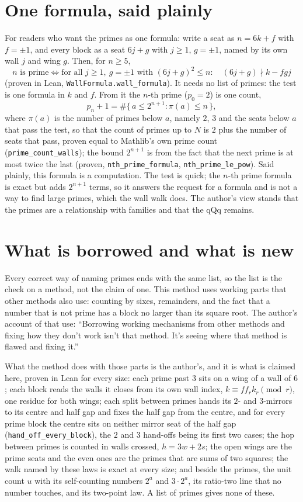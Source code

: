 \documentclass[11pt]{article}
\begin{document}
\section{One formula, said plainly}
For readers who want the primes as one formula: write a seat as $n = 6k+f$ with $f=\pm1$, and every block as a seat $6j+g$ with $j\ge1$, $g=\pm1$, named by its own wall $j$ and wing $g$. Then, for $n\ge5$,
\[ n \text{ is prime} \iff \text{for all } j\ge1,\ g=\pm1 \text{ with } (6j+g)^2\le n:\quad (6j+g)\nmid k - f g j \]
(proven in Lean, \texttt{WallFormula.wall\_formula}). It needs no list of primes: the test is one formula in $k$ and $f$. From it the $n$-th prime ($p_0 = 2$) is one count,
\[ p_n + 1 = \#\{\, a \le 2^{n+1} : \pi(a) \le n \,\}, \]
where $\pi(a)$ is the number of primes below $a$, namely $2$, $3$ and the seats below $a$ that pass the test, so that the count of primes up to $N$ is $2$ plus the number of seats that pass, proven equal to Mathlib's own prime count (\texttt{prime\_count\_walls}); the bound $2^{n+1}$ is from the fact that the next prime is at most twice the last (proven, \texttt{nth\_prime\_formula}, \texttt{nth\_prime\_le\_pow}). Said plainly, this formula is a computation. The test is quick; the $n$-th prime formula is exact but adds $2^{n+1}$ terms, so it answers the request for a formula and is not a way to find large primes, which the wall walk does. The author's view stands that the primes are a relationship with families and that the qQq remains.

\section{What is borrowed and what is new}
Every correct way of naming primes ends with the same list, so the list is the check on a method, not the claim of one. This method uses working parts that other methods also use: counting by sixes, remainders, and the fact that a number that is not prime has a block no larger than its square root. The author's account of that use: ``Borrowing working mechanisms from other methods and fixing how they don't work isn't that method. It's seeing where that method is flawed and fixing it.''

What the method does with those parts is the author's, and it is what is claimed here, proven in Lean for every size: each prime past $3$ sits on a wing of a wall of $6$; each block reads the walls it closes from its own wall index, $k\equiv f f_r k_r \pmod r$, one residue for both wings; each split between primes hands its $2$- and $3$-mirrors to its centre and half gap and fixes the half gap from the centre, and for every prime block the centre sits on neither mirror seat of the half gap (\texttt{hand\_off\_every\_block}), the $2$ and $3$ hand-offs being its first two cases; the hop between primes is counted in walls crossed, $h = 3w+2s$; the open wings are the prime seats and the even ones are the primes that are sums of two squares; the walk named by these laws is exact at every size; and beside the primes, the unit count $u$ with its self-counting numbers $2^a$ and $3\cdot2^a$, its ratio-two line that no number touches, and its two-point law. A list of primes gives none of these.
\end{document}

